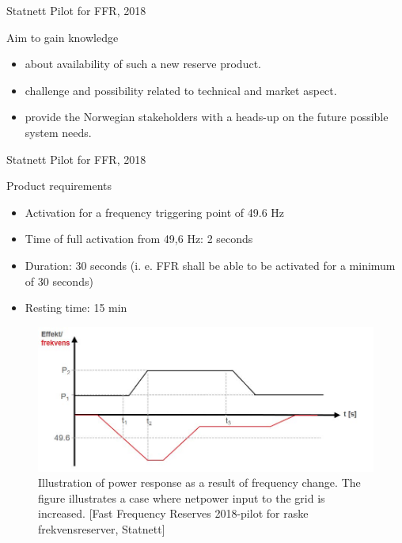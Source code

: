 \documentclass{beamer}
\begin{document}

\begin{frame}{Statnett Pilot for FFR, 2018}
\begin{block}{Aim to gain knowledge}
\begin{itemize}
\item about availability of such a new reserve product.
\item challenge and possibility related to technical and market aspect.
\item provide the Norwegian stakeholders with a heads-up on the future possible system needs.
\end{itemize}
\end{block}
\end{frame}
\begin{frame}{Statnett Pilot for FFR, 2018}
\begin{block}{Product requirements}
\begin{itemize}
\item Activation for a frequency triggering point of 49.6 Hz
\item Time of full activation from 49,6 Hz: 2 seconds
\item Duration: 30 seconds (i. e. FFR shall be able to be activated for a minimum of 30 seconds)
\item Resting time: 15 min
\end{itemize}
\end{block}

\begin{figure}
\includegraphics[scale=0.4]{Figures/ProdPilot2018.jpg}
\caption{\tiny Illustration of power response as a result of frequency change. The figure illustrates a case where netpower input to the grid is increased. [Fast Frequency Reserves 2018-pilot for raske frekvensreserver, Statnett]}

\end{figure}
\end{frame}
\end{document}
